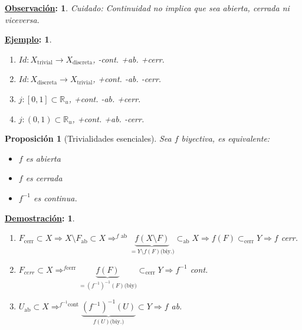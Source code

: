 \documentclass[10pt,a4paper,openright]{book}
\theoremstyle{break}
\newtheorem*{prop}{Proposición}
\newtheorem*{demo}{\underline{Demostración}:}
\newtheorem*{obs}{\underline{Observación}:}
\newtheorem*{ej}{\underline{Ejemplo}:}
\begin{document}
\begin{obs}
Cuidado: Continuidad no implica que sea abierta, cerrada ni viceversa.
\end{obs}

\begin{ej}
\begin{enumerate}
    \item $Id: X_{\text{trivial}} \rightarrow X_{\text{discreta}}$, -cont. +ab. +cerr.
    \item $Id: X_{\text{discreta}} \rightarrow X_{\text{trivial}}$, +cont. -ab. -cerr.
    \item $j: \left[ 0, 1 \right] \subset \mathbb{R}_{u}$, +cont. -ab. +cerr.
    \item $j: \left( 0, 1 \right) \subset \mathbb{R}_u$, +cont. +ab. -cerr.
\end{enumerate}
\end{ej}

\begin{prop}[Trivialidades esenciales]
Sea $f$ biyectiva, es equivalente:
\begin{itemize}
    \item $f$ es abierta
    \item $f$ es cerrada
    \item $f^{-1}$ es continua.
\end{itemize}
\end{prop}
\begin{demo}
\begin{enumerate}
    \item $F_{\text{cerr}} \subset X \Rightarrow X\setminus F_{\text{ab}} \subset X \Rightarrow^{ f\text{ ab}} \underbrace{f\left( X\setminus F \right)}_{= Y\setminus f\left( F \right) \text{(biy.)}} \subset_{\text{ab}} X \Rightarrow f\left( F \right) \subset_{\text{cerr}} Y \Rightarrow f$ cerr.

    \item $F_{cerr} \subset X \Rightarrow^{f \text{cerr}} \underbrace{f\left( F \right)}_{= \left( f^{-1} \right)^{-1} \left( F \right) \text{(biy)}} \subset_{\text{cerr}} Y \Rightarrow f^{-1}$ cont.

    \item $U_{\text{ab}} \subset X \Rightarrow^{f^{-1} \text{cont}} \underbrace{\left( f^{-1} \right) ^{-1} \left( U \right) }_{f\left( U \right) \text{(biy.)}} \subset Y \Rightarrow f$ ab.
\end{enumerate}
\end{demo}
\end{document}
